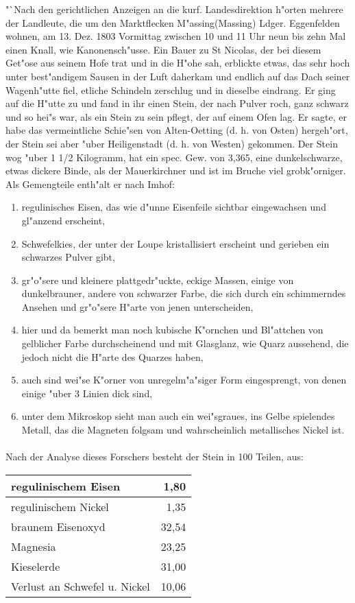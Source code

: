 \documentclass[a4paper, 11pt, oneside]{article}
\begin{document}
"`Nach den gerichtlichen Anzeigen an die kurf. Landesdirektion h"orten mehrere der Landleute, die um den Marktflecken M"assing(Massing) Ldger. Eggenfelden wohnen, am 13. Dez. 1803 Vormittag zwischen 10 und 11 Uhr neun bis zehn Mal einen Knall, wie Kanonensch"usse. Ein Bauer zu St Nicolas, der bei diesem Get"ose aus seinem Hofe trat und in die H"ohe sah, erblickte etwas, das sehr hoch unter best"andigem Sausen in der Luft daherkam und endlich auf das Dach seiner Wagenh"utte fiel, etliche Schindeln zerschlug und in dieselbe eindrang. Er ging auf die H"utte zu und fand in ihr einen Stein, der nach Pulver roch, ganz schwarz und so hei"s war, als ein Stein zu sein pflegt, der auf einem Ofen lag. Er sagte, er habe das vermeintliche Schie"sen von Alten-Oetting (d. h. von Osten) hergeh"ort, der Stein sei aber "uber Heiligenstadt (d. h. von Westen) gekommen. Der Stein wog "uber 1 1/2 Kilogramm, hat ein spec. Gew. von 3,365, eine dunkelschwarze, etwas dickere Binde, als der Mauerkirchner und ist im Bruche viel grobk"orniger. Als Gemengteile enth"alt er nach Imhof:
\begin{enumerate}
    \item regulinisches Eisen, das wie d"unne Eisenfeile sichtbar eingewachsen und gl"anzend erscheint,
    \item Schwefelkies, der unter der Loupe kristallisiert erscheint und gerieben ein schwarzes Pulver gibt,
    \item gr"o"sere und kleinere plattgedr"uckte, eckige Massen, einige von dunkelbrauner, andere von schwarzer Farbe, die sich durch ein schimmerndes Ansehen und gr"o"sere H"arte von jenen unterscheiden,
    \item hier und da bemerkt man noch kubische K"ornchen und Bl"attchen von gelblicher Farbe durchscheinend und mit Glasglanz, wie Quarz aussehend, die jedoch nicht die H"arte des Quarzes haben,
    \item auch sind wei"se K"orner von unregelm"a"siger Form eingesprengt, von denen einige "uber 3 Linien dick sind,
    \item unter dem Mikroskop sieht man auch ein wei"sgraues, ins Gelbe spielendes Metall, das die Magneten folgsam und wahrscheinlich metallisches Nickel ist.
\end{enumerate}
\paragraph{}
Nach der Analyse dieses Forschers besteht der Stein in 100 Teilen, aus:
\begin{center}
    \begin{tabular}{ |l|r| } 
    \hline
    regulinischem Eisen & 1,80\\\hline
    regulinischem Nickel & 1,35\\\hline
    braunem Eisenoxyd & 32,54\\\hline
    Magnesia & 23,25\\\hline
    Kieselerde & 31,00\\\hline
    Verlust an Schwefel u. Nickel & 10,06\\
    \hline
    \end{tabular}
\end{center}
\end{document}
